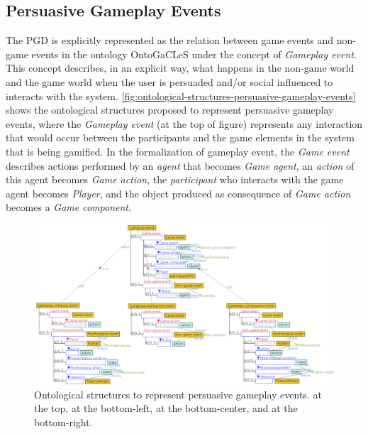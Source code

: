 \subsection{Persuasive Gameplay Events}
\label{subsec:persuasive-gameplay-event}

The PGD is explicitly represented as the relation between game events and non-game events in the ontology OntoGaCLeS under the concept of \emph{Gameplay event}. This concept describes, in an explicit way, what happens in the non-game world and the game world when the user is persuaded and/or social influenced to interacts with the system. %
\autoref{fig:ontological-structures-persuasive-gameplay-events} shows the ontological structures proposed to represent persuasive gameplay events, where the \emph{Gameplay event} (at the top of figure) represents any interaction that would occur between the participants and the game elements in the system that is being gamified. In the formalization of gameplay event, the \emph{Game event} describes actions performed by an \emph{agent} that becomes \emph{Game agent}, an \emph{action} of this agent becomes \emph{Game action}, the \emph{participant} who interacts with the game agent becomes \emph{Player}, and the object produced as consequence of \emph{Game action} becomes a \emph{Game component}.

\begin{figure}[!htb]
 \caption[Ontological structures to represent persuasive gameplay events]{Ontological structures to represent persuasive gameplay events.  at the top,  at the bottom-left,  at the bottom-center, and  at the bottom-right.}
 \label{fig:ontological-structures-persuasive-gameplay-events}
 \centering
 \includegraphics[width=1\textwidth]{images/chap-ontogacles2/ontological-structures-persuasive-gameplay-events.png}
 \fautor
\end{figure}

